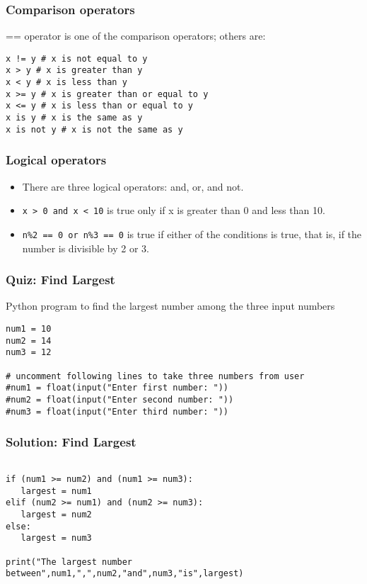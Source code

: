 \begin{frame}[fragile]\frametitle{Comparison operators}
== operator is one of the comparison operators; others are:
\begin{lstlisting}
x != y # x is not equal to y
x > y # x is greater than y
x < y # x is less than y
x >= y # x is greater than or equal to y
x <= y # x is less than or equal to y
x is y # x is the same as y
x is not y # x is not the same as y
\end{lstlisting}
\end{frame}

\begin{frame}[fragile]\frametitle{Logical operators}
\begin{itemize}
\item There are three logical operators: and, or, and not. 
\item \lstinline|x > 0 and x < 10| is true only if x is greater than 0 and less than 10.
\item \lstinline|n%2 == 0 or n%3 == 0| is true if either of the conditions is true, that is, if the number is divisible by 2 or 3.
\end{itemize}
\end{frame}



\begin{frame}[fragile]\frametitle{Quiz: Find Largest}
Python program to find the largest number among the three input numbers
\begin{lstlisting}
num1 = 10
num2 = 14
num3 = 12

# uncomment following lines to take three numbers from user
#num1 = float(input("Enter first number: "))
#num2 = float(input("Enter second number: "))
#num3 = float(input("Enter third number: "))

\end{lstlisting}
\end{frame}


\begin{frame}[fragile]\frametitle{Solution: Find Largest}
\begin{lstlisting}

if (num1 >= num2) and (num1 >= num3):
   largest = num1
elif (num2 >= num1) and (num2 >= num3):
   largest = num2
else:
   largest = num3

print("The largest number between",num1,",",num2,"and",num3,"is",largest)
\end{lstlisting}
\end{frame}


